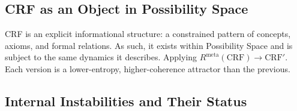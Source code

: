 \documentclass[12pt, a4paper]{article}
\begin{document}
\subsection{CRF as an Object in Possibility Space}

CRF is an explicit informational structure: a constrained pattern of concepts, axioms, and
formal relations. As such, it exists within Possibility Space and is subject to the same
dynamics it describes. Applying $R^{\mathrm{meta}}(\mathrm{CRF}) \to \mathrm{CRF}'$.
Each version is a lower-entropy, higher-coherence attractor than the previous.

\subsection{Internal Instabilities and Their Status}
\end{document}
